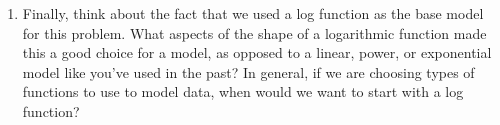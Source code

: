 \documentclass[11pt,letterpaper]{article}
\begin{document}
\begin{enumerate}
    \item Finally, think about the fact that we used a log function as the base model for this problem. What aspects of the shape of a logarithmic function made this a good choice for a model, as opposed to a linear, power, or exponential model like you've used in the past? In general, if we are choosing types of functions to use to model data, when would we want to start with a log function? 

\end{enumerate}

	
\end{document}
